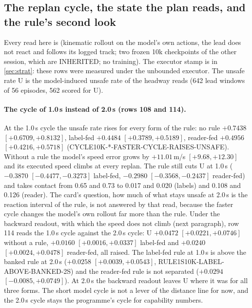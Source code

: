 \subsection{The replan cycle, the state the plan reads, and the rule's second look}\label{sec:cycle}
Every read here is  (kinematic rollout on the model's own actions, the lead does not react and follows its logged track; two frozen 10k checkpoints of the other session, which are INHERITED; no training). The executor stamp is in \cref{sec:strat}: these rows were measured under the unbounded executor. The unsafe rate U is the model-induced unsafe rate of the headway reads (642 lead windows of 56 episodes, 562 scored for U).

\paragraph{The cycle of 1.0\,s instead of 2.0\,s (rows 108 and 114).} At the 1.0\,s cycle the unsafe rate rises for every form of the rule: no rule $+0.7438$ $[+0.6709,+0.8132]$, label-fed $+0.4484$ $[+0.3789,+0.5189]$, reader-fed $+0.4956$ $[+0.4216,+0.5718]$ (CYCLE10K-*-FASTER-CYCLE-RAISES-UNSAFE). Without a rule the model's speed error grows by $+11.01$\,m/s $[+9.68,+12.30]$ and its executed speed climbs at every replan. The rule still cuts U at 1.0\,s ($-0.3870$ $[-0.4477,-0.3273]$ label-fed, $-0.2980$ $[-0.3568,-0.2437]$ reader-fed) and takes contact from 0.65 and 0.73 to 0.017 and 0.020 (labels) and 0.108 and 0.126 (reader). The card's question, how much of what stays unsafe at 2.0\,s is the reaction interval of the rule, is not answered by that read, because the faster cycle changes the model's own rollout far more than the rule. Under the backward readout, with which the speed does not climb (next paragraph), row 114 reads the 1.0\,s cycle against the 2.0\,s cycle: U $+0.0472$ $[+0.0221,+0.0746]$ without a rule, $+0.0160$ $[+0.0016,+0.0337]$ label-fed and $+0.0240$ $[+0.0024,+0.0478]$ reader-fed, all raised. The label-fed rule at 1.0\,s is above the banked rule at 2.0\,s ($+0.0258$ $[+0.0039,+0.0543]$, RULE1S10K-LABEL-ABOVE-BANKED-2S) and the reader-fed rule is not separated ($+0.0294$ $[-0.0085,+0.0749]$). At 2.0\,s the backward readout leaves U where it was for all three forms. The short model cycle is not a lever of the distance line for now, and the 2.0\,s cycle stays the programme's cycle for capability numbers.

